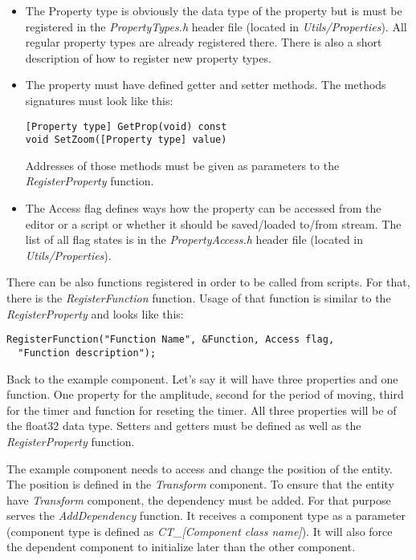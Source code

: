 \documentclass[a4paper, 12pt]{report}
\begin{document}
\begin{itemize}
\item
The Property type is obviously the data type of the property but is must be registered in the \emph{PropertyTypes.h} header file (located in \emph{Utils/Properties}). All regular property types are already registered there. There is also a short description of how to register new property types.

\item
The property must have defined getter and setter methods. The methods signatures must look like this:

\begin{verbatim}
[Property type] GetProp(void) const
void SetZoom([Property type] value)
\end{verbatim}

Addresses of those methods must be given as parameters to the \emph{RegisterProperty} function.

\item
The Access flag defines ways how the property can be accessed from the editor or a script or whether it should be saved/loaded to/from stream. The list of all flag states is in the \emph{PropertyAccess.h} header file (located in \emph{Utils/Properties}).
\end{itemize}

There can be also functions registered in order to be called from scripts. For that, there is the \emph{RegisterFunction} function. Usage of that function is similar to the \emph{RegisterProperty} and looks like this:

\begin{verbatim}
RegisterFunction("Function Name", &Function, Access flag,
  "Function description");
\end{verbatim}

Back to the example component. Let's say it will have three properties and one function. One property for the amplitude, second for the period of moving, third for the timer and function for reseting the timer. All three properties will be of the float32 data type. Setters and getters must be defined as well as the \emph{RegisterProperty} function. 

The example component needs to access and change the position of the entity. The position is defined in the \emph{Transform} component. To ensure that the entity have \emph{Transform} component, the dependency must be added. For that purpose serves the \emph{AddDependency} function. It receives a component type as a parameter (component type is defined as \emph{CT\_[Component class name]}). It will also force the dependent component to initialize later than the other component.
\end{document}
